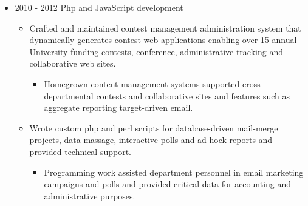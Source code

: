 \documentclass[11pt,a4paper,sans]{moderncv}   %
\begin{document}
{\begin{itemize}
\begin{itemize}
\begin{itemize}
      \end{itemize}
    \end{itemize}
\item 2010 - 2012 Php and JavaScript development
  \begin{itemize}%
  \item Crafted and maintained contest management administration
    system that dynamically generates contest web applications
    enabling over 15 annual University funding contests, conference,
    administrative tracking and collaborative web sites.
    \begin{itemize}%
    \item Homegrown content management systems supported
      cross-departmental contests and collaborative sites and
      features such as aggregate reporting target-driven email.
    \end{itemize}
  \item Wrote custom php and perl scripts for database-driven
    mail-merge projects, data massage, interactive polls and
    ad-hock reports and provided technical support.
    \begin{itemize}%
    \item Programming work assisted department personnel in email marketing
      campaigns and polls and provided critical data for accounting and administrative purposes.
    \end{itemize}
  \end{itemize}
\end{itemize}
}
\end{document}
